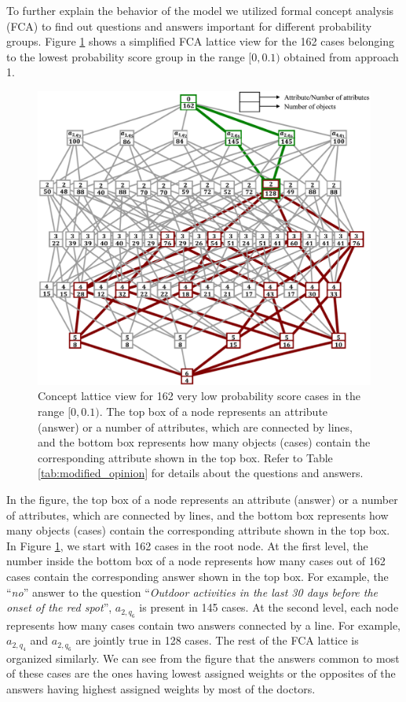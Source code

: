 To further explain the behavior of the model we utilized formal concept analysis (FCA) to find out questions and answers important for different probability groups. Figure \ref{fig:FCA_lattice} shows a simplified FCA lattice view for the 162 cases belonging to the lowest probability score group in the range $[0,0.1)$ obtained from approach 1.
\begin{figure}[htb!]
	\centering
	\includegraphics[width=\textwidth, keepaspectratio]{images/elicitation/FCA-lattice.pdf}
	\caption[Concept lattice view for 162 very low probability score cases in the range  $[0,0.1)$]{Concept lattice view for 162 very low probability score cases in the range  $[0,0.1)$. The top box of a node represents an attribute (answer) or a number of attributes, which are connected by lines, and the bottom box represents how many objects (cases) contain the corresponding attribute shown in the top box. Refer to Table \ref{tab:modified_opinion} for details about the questions and answers.}
	\label{fig:FCA_lattice}
\end{figure}
In the figure, the top box of a node represents an attribute (answer) or a number of attributes, which are connected by lines, and the bottom box represents how many objects (cases) contain the corresponding attribute shown in the top box. In Figure \ref{fig:FCA_lattice}, we start with 162 cases in the root node. At the first level, the number inside the bottom box of a node represents how many cases out of 162 cases contain the corresponding answer shown in the top box. For example, the \enquote{\textit{no}} answer to the question \enquote{\textit{Outdoor activities in the last 30 days before the onset of the red spot}}, \( a_{2,q_{6}}\)  is present in 145 cases. At the second level, each node represents how many cases contain two answers connected by a line. For example, \( a_{2,q_{4}}\) and \( a_{2,q_{6}}\) are jointly true in 128 cases. The rest of the FCA lattice is organized similarly. We can see from the figure that the answers common to most of these cases are the ones having lowest assigned weights or the opposites of the answers having highest assigned weights by most of the doctors.

